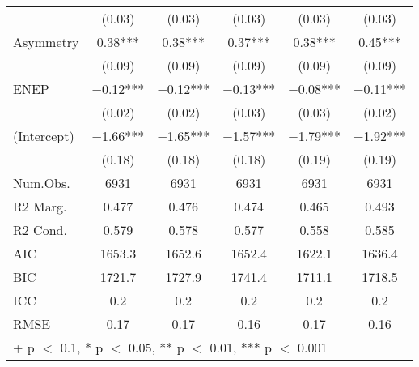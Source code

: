 \begin{table}
\begin{tabular}[t]{lccccc}
 & (\num{0.03}) & (\num{0.03}) & (\num{0.03}) & (\num{0.03}) & (\num{0.03})\\
Asymmetry & \num{0.38}*** & \num{0.38}*** & \num{0.37}*** & \num{0.38}*** & \num{0.45}***\\
 & (\num{0.09}) & (\num{0.09}) & (\num{0.09}) & (\num{0.09}) & (\num{0.09})\\
ENEP & \num{-0.12}*** & \num{-0.12}*** & \num{-0.13}*** & \num{-0.08}*** & \num{-0.11}***\\
 & (\num{0.02}) & (\num{0.02}) & (\num{0.03}) & (\num{0.03}) & (\num{0.02})\\
(Intercept) & \num{-1.66}*** & \num{-1.65}*** & \num{-1.57}*** & \num{-1.79}*** & \num{-1.92}***\\
 & (\num{0.18}) & (\num{0.18}) & (\num{0.18}) & (\num{0.19}) & (\num{0.19})\\
\midrule
Num.Obs. & \num{6931} & \num{6931} & \num{6931} & \num{6931} & \num{6931}\\
R2 Marg. & \num{0.477} & \num{0.476} & \num{0.474} & \num{0.465} & \num{0.493}\\
R2 Cond. & \num{0.579} & \num{0.578} & \num{0.577} & \num{0.558} & \num{0.585}\\
AIC & \num{1653.3} & \num{1652.6} & \num{1652.4} & \num{1622.1} & \num{1636.4}\\
BIC & \num{1721.7} & \num{1727.9} & \num{1741.4} & \num{1711.1} & \num{1718.5}\\
ICC & \num{0.2} & \num{0.2} & \num{0.2} & \num{0.2} & \num{0.2}\\
RMSE & \num{0.17} & \num{0.17} & \num{0.16} & \num{0.17} & \num{0.16}\\
\bottomrule
\multicolumn{6}{l}{\rule{0pt}{1em}+ p $<$ 0.1, * p $<$ 0.05, ** p $<$ 0.01, *** p $<$ 0.001}\\
\end{tabular}
\end{table}
